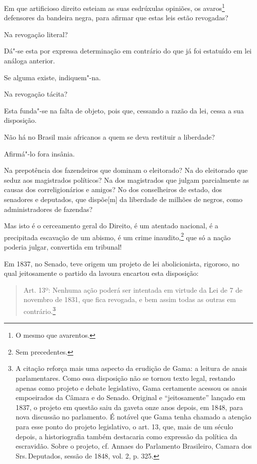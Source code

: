 \asterisc

Em que artificioso direito esteiam as suas esdrúxulas opiniões, os
avaros\footnote{O mesmo que avarentos.} defensores da bandeira negra,
para afirmar que estas leis estão revogadas?

Na revogação literal?

Dá"-se esta por expressa determinação em contrário do que já foi
estatuído em lei análoga anterior.

Se alguma existe, indiquem"-na.

Na revogação tácita?

Esta funda"-se na falta de objeto, pois que, cessando a razão da lei,
cessa a sua disposição.

Não há no Brasil mais africanos a quem se deva restituir a liberdade?

Afirmá"-lo fora insânia.

Na prepotência dos fazendeiros que dominam o eleitorado? Na do
eleitorado que seduz aos magistrados políticos? Na dos magistrados que
julgam parcialmente as causas dos correligionários e amigos? No dos
conselheiros de estado, dos senadores e deputados, que dispõe{[}m{]} da
liberdade de milhões de negros, como administradores de fazendas?

Mas isto é o cerceamento geral do Direito, é um atentado nacional, é a
precipitada escavação de um abismo, é um crime inaudito,\footnote{Sem
  precedentes.} que só a nação poderia julgar, convertida em tribunal!

Em 1837, no Senado, teve origem um projeto de lei abolicionista,
rigoroso, no qual jeitosamente o partido da lavoura encartou esta
disposição:

\begin{quote}
Art. 13º: Nenhuma ação poderá ser intentada em virtude da Lei de 7 de
novembro de 1831, que fica revogada, e bem assim todas as outras em
contrário.\footnote{A citação reforça mais uma aspecto da erudição de
  Gama: a leitura de anais parlamentares. Como essa disposição não se
  tornou texto legal, restando apenas como projeto e debate legislativo,
  Gama certamente acessou os anais empoeirados da Câmara e do Senado.
  Original e ``jeitosamente'' lançado em 1837, o projeto em questão saiu
  da gaveta onze anos depois, em 1848, para nova discussão no
  parlamento. É notável que Gama tenha chamado a atenção para esse ponto
  do projeto legislativo, o art. 13, que, mais de um século depois, a
  historiografia também destacaria como expressão da política da
  escravidão. Sobre o projeto, cf. Annaes do Parlamento Brasileiro,
  Camara dos Srs.\,Deputados, sessão de 1848, vol. 2, p. 325.}
\end{quote}


